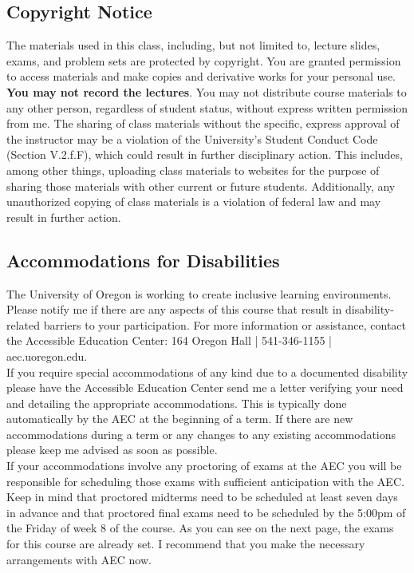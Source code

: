 \documentclass[11pt]{article}
\begin{document}
	\subsection*{Copyright Notice}
	
The materials used in this class, including, but not limited to, lecture slides, exams, and problem sets are protected by copyright. You are granted permission to access materials and make copies and derivative works for your personal use. \textbf{You may not record the lectures}. You may not distribute course materials to any other person, regardless of student status, without express written permission from me. The sharing of class materials without the specific, express approval of the instructor may be a violation of the University’s Student Conduct Code (Section V.2.f.F), which could result in further disciplinary action. This includes, among other things, uploading class materials to websites for the purpose of sharing those materials with other current or future students. Additionally, any unauthorized copying of class materials is a violation of federal law and may result in further action.

	
	\subsection*{Accommodations for Disabilities}
	
	The University of Oregon is working to create inclusive learning environments. Please notify me if there are any aspects of this course that result in disability-related barriers to your participation. For more information or assistance, contact the Accessible Education Center: 164 Oregon Hall | 541-346-1155 | aec.uoregon.edu.\\
	
	If you require special accommodations of any kind due to a documented disability please have the Accessible Education Center send me a letter verifying your need and detailing the appropriate accommodations. This is typically done automatically by the AEC at the beginning of a term. If there are new accommodations during a term or any changes to any existing accommodations please keep me advised as soon as possible.\\
	
\noindent	If your accommodations involve any proctoring of exams at the AEC you will be responsible for scheduling those exams with sufficient anticipation with the AEC. Keep in mind that proctored midterms need to be scheduled at least seven days in advance and that proctored final exams need to be scheduled by the 5:00pm of the Friday of week 8 of the course. As you can see on the next page, the exams for this course are already set. I recommend that you make the necessary arrangements with AEC now.
	
\end{document}
